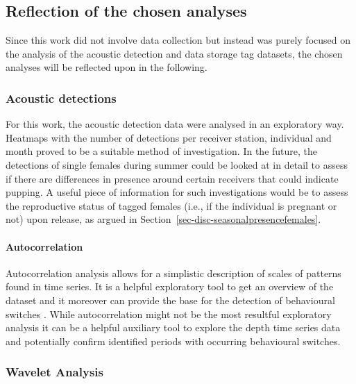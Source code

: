 \documentclass[
  authoryear,
  review,
  3p]{elsarticle}
\let\oldparagraph\paragraph
\renewcommand{\paragraph}[1]{\oldparagraph{#1}\mbox{}}
\begin{document}
\hypertarget{reflection-of-the-chosen-analyses}{%
\subsection{Reflection of the chosen
analyses}\label{reflection-of-the-chosen-analyses}}

Since this work did not involve data collection but instead was purely
focused on the analysis of the acoustic detection and data storage tag
datasets, the chosen analyses will be reflected upon in the following.

\hypertarget{acoustic-detections-1}{%
\subsubsection{Acoustic detections}\label{acoustic-detections-1}}

For this work, the acoustic detection data were analysed in an
exploratory way. Heatmaps with the number of detections per receiver
station, individual and month proved to be a suitable method of
investigation. In the future, the detections of single females during
summer could be looked at in detail to assess if there are differences
in presence around certain receivers that could indicate pupping. A
useful piece of information for such investigations would be to assess
the reproductive status of tagged females (i.e., if the individual is
pregnant or not) upon release, as argued in
Section~\ref{sec-disc-seasonalpresencefemales}.

\hypertarget{autocorrelation}{%
\paragraph{Autocorrelation}\label{autocorrelation}}

Autocorrelation analysis allows for a simplistic description of scales
of patterns found in time series. It is a helpful exploratory tool to
get an overview of the dataset \citep{dray_2010} and it moreover can
provide the base for the detection of behavioural switches
\citep{gurarie_2016}. While autocorrelation might not be the most
resultful exploratory analysis it can be a helpful auxiliary tool to
explore the depth time series data and potentially confirm identified
periods with occurring behavioural switches.

\hypertarget{wavelet-analysis-1}{%
\subsubsection{Wavelet Analysis}\label{wavelet-analysis-1}}
\end{document}
